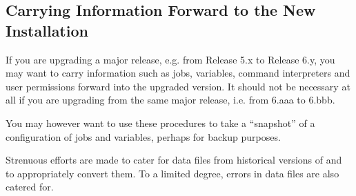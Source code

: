 {\subsection{Carrying Information Forward to the New Installation}
If you are upgrading a major release, e.g. from Release 5.x to Release
6.y, you may want to carry information such as jobs, variables, command
interpreters and user permissions forward into the upgraded version. It
should not be necessary at all if you are upgrading from the same major
release, i.e. from 6.aaa to 6.bbb.

You may however want to use these procedures to take a ``snapshot'' of a configuration of jobs and
variables, perhaps for backup purposes.

Strenuous efforts are made to cater for data files from historical
versions of \ProductName{} and to appropriately convert them. To a limited
degree, errors in data files are also catered for.}


